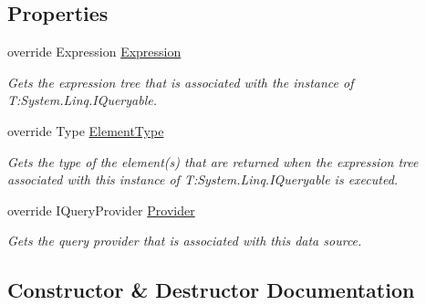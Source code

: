 \subsection*{Properties}
\begin{DoxyCompactItemize}
\item 
override Expression \hyperlink{classCqrs_1_1Azure_1_1BlobStorage_1_1BlobStorageStore_a8b3be7237234e7de532fccbfa6bbade8_a8b3be7237234e7de532fccbfa6bbade8}{Expression}
\begin{DoxyCompactList}\small\item\em Gets the expression tree that is associated with the instance of T\+:\+System.\+Linq.\+I\+Queryable. \end{DoxyCompactList}\item 
override Type \hyperlink{classCqrs_1_1Azure_1_1BlobStorage_1_1BlobStorageStore_af4f4ed2c32ce521ebf164e63ef453b9c_af4f4ed2c32ce521ebf164e63ef453b9c}{Element\+Type}
\begin{DoxyCompactList}\small\item\em Gets the type of the element(s) that are returned when the expression tree associated with this instance of T\+:\+System.\+Linq.\+I\+Queryable is executed. \end{DoxyCompactList}\item 
override I\+Query\+Provider \hyperlink{classCqrs_1_1Azure_1_1BlobStorage_1_1BlobStorageStore_acbc7f5a9d6eb9d1ece9a9035f185d4bf_acbc7f5a9d6eb9d1ece9a9035f185d4bf}{Provider}
\begin{DoxyCompactList}\small\item\em Gets the query provider that is associated with this data source. \end{DoxyCompactList}\end{DoxyCompactItemize}


\subsection{Constructor \& Destructor Documentation}
\mbox{\label{classCqrs_1_1Azure_1_1BlobStorage_1_1BlobStorageStore_ae1979c63b97dea8e207dda7b0087ee6b_ae1979c63b97dea8e207dda7b0087ee6b}} 
